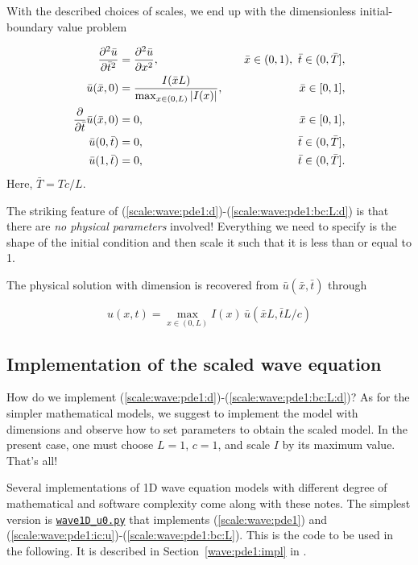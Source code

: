 \documentclass[graybox,envcountchap,sectrefs,final]{svmonodo}
\begin{document}
With the described choices of scales,
we end up with the dimensionless initial-boundary value problem

\begin{align}
\frac{\partial^2 \bar u}{\partial \bar t^2} &=
{\partial^2 \bar u\over\partial x^2}, \quad & \bar x\in (0,1),\ \bar t\in (0,\bar T],
\label{scale:wave:pde1:d}\\ 
\bar u(\bar x,0) &= \frac{I(\bar x L)}{\max_{x\in(0,L)} |I(x)|},
\quad &\bar x\in [0,1],
\label{scale:wave:pde1:ic:u:d}\\ 
{\partial\over\partial \bar t}\bar u(\bar x,0) &= 0,
\quad & \bar x\in [0,1],
\label{scale:wave:pde1:ic:ut:d}\\ 
\bar u(0,\bar t) & = 0,
\quad  &\bar t\in (0,\bar T],
\label{scale:wave:pde1:bc:0:d}\\ 
\bar u(1,\bar t) & = 0,
\quad  &\bar t\in (0,\bar T].
\label{scale:wave:pde1:bc:L:d}
\end{align}
Here, $\bar T = Tc/L$.

The striking feature of
(\ref{scale:wave:pde1:d})-(\ref{scale:wave:pde1:bc:L:d})
is that there are \emph{no physical parameters} involved! Everything we need
to specify is the shape of the initial condition and then scale it
such that it is less than or equal to 1.

The physical solution with dimension is recovered from $\bar u(\bar x,\bar t)$
through

\begin{equation}
u(x,t) = \max_{x\in(0,L)}I(x)\,\bar u(\bar x L, \bar t L/c)
\end{equation}

\subsection{Implementation of the scaled wave equation}
\label{sec:scale:wave:impl}

How do we implement (\ref{scale:wave:pde1:d})-(\ref{scale:wave:pde1:bc:L:d})?
As for the simpler mathematical models, we suggest to implement the model
with dimensions and observe how to set parameters to obtain the scaled
model. In the present case, one must choose $L=1$, $c=1$, and scale $I$ by its
maximum value. That's all!

Several implementations of 1D wave equation models with different
degree of mathematical and software complexity come along with these
notes. The simplest
version is \href{{http://tinyurl.com/o8pb3yy/wave1D_u0.py}}{\nolinkurl{wave1D_u0.py}}
that implements (\ref{scale:wave:pde1}) and
(\ref{scale:wave:pde1:ic:u})-(\ref{scale:wave:pde1:bc:L}).
This is the code to be used in the following. It is described
in Section~\ref{wave:pde1:impl} in \cite{Langtangen_Linge_fdm}.
\end{document}
